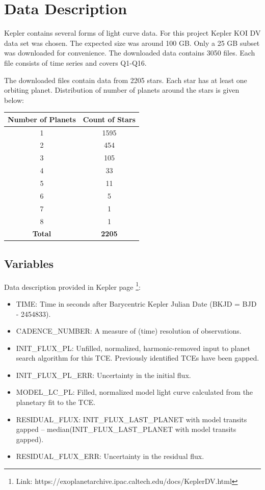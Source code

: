 \documentclass[%
aip,
amsmath,amssymb,
reprint,%
]{revtex4-1}
\begin{document}
\section{Data Description}

Kepler contains several forms of light curve data. For this project Kepler KOI DV data set was chosen. The expected size was around 100 GB. Only a 25 GB subset was downloaded for convenience. The downloaded data contains 3050 files. Each file consists of time series and covers Q1-Q16.

The downloaded files contain data from 2205 stars. Each star has at least one orbiting planet. Distribution of number of planets around the stars is given below:

\begin{center}
 \begin{tabular}{| c | c |} 
 \hline
 \textbf{Number of Planets} & \textbf{Count of Stars}\\ [0.5 ex]
 \hline
 1 & 1595 \\ 
 \hline
 2 & 454 \\
 \hline
 3 & 105 \\
 \hline
 4 & 33 \\
 \hline
 5 & 11 \\
 \hline
 6 & 5 \\
 \hline
 7 & 1 \\
 \hline
 8 & 1 \\
 \hline
 \textbf{Total} & \textbf{2205} \\ [1ex] 
 \hline
\end{tabular}
\end{center}


\subsection{Variables}

Data description provided in Kepler page \footnote{Link: https://exoplanetarchive.ipac.caltech.edu/docs/KeplerDV.html}:

\begin{itemize}
  \item TIME: Time in seconds after Barycentric Kepler Julian Date (BKJD = BJD - 2454833).
  \item CADENCE\_NUMBER: A measure of (time) resolution of observations.
  \item INIT\_FLUX\_PL: Unfilled, normalized, harmonic-removed input to planet search algorithm for this TCE. Previously identified TCEs have been gapped.
  \item INIT\_FLUX\_PL\_ERR: Uncertainty in the initial flux.
  \item MODEL\_LC\_PL: Filled, normalized model light curve calculated from the planetary fit to the TCE.
  \item RESIDUAL\_FLUX: INIT\_FLUX\_LAST\_PLANET with model transits gapped – median(INIT\_FLUX\_LAST\_PLANET with model transits gapped).
  \item RESIDUAL\_FLUX\_ERR: Uncertainty in the residual flux.
\end{itemize}
\end{document}
